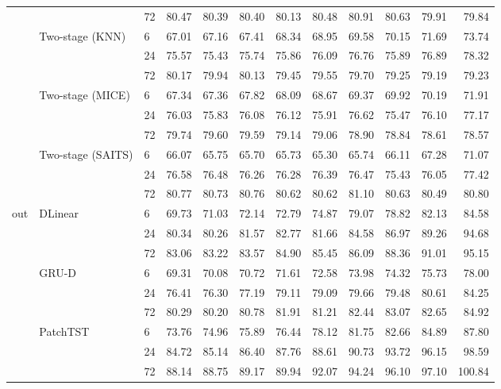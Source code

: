 \begin{table}
\begin{tabular}{lllrrrrrrrrr}
 &  & 72 & 80.47 & 80.39 & 80.40 & 80.13 & 80.48 & 80.91 & 80.63 & 79.91 & 79.84 \\
\cline{2-12}
 & \multirow[t]{3}{*}{Two-stage (KNN)} & 6 & 67.01 & 67.16 & 67.41 & 68.34 & 68.95 & 69.58 & 70.15 & 71.69 & 73.74 \\
 &  & 24 & 75.57 & 75.43 & 75.74 & 75.86 & 76.09 & 76.76 & 75.89 & 76.89 & 78.32 \\
 &  & 72 & 80.17 & 79.94 & 80.13 & 79.45 & 79.55 & 79.70 & 79.25 & 79.19 & 79.23 \\
\cline{2-12}
 & \multirow[t]{3}{*}{Two-stage (MICE)} & 6 & 67.34 & 67.36 & 67.82 & 68.09 & 68.67 & 69.37 & 69.92 & 70.19 & 71.91 \\
 &  & 24 & 76.03 & 75.83 & 76.08 & 76.12 & 75.91 & 76.62 & 75.47 & 76.10 & 77.17 \\
 &  & 72 & 79.74 & 79.60 & 79.59 & 79.14 & 79.06 & 78.90 & 78.84 & 78.61 & 78.57 \\
\cline{2-12}
 & \multirow[t]{3}{*}{Two-stage (SAITS)} & 6 & 66.07 & 65.75 & 65.70 & 65.73 & 65.30 & 65.74 & 66.11 & 67.28 & 71.07 \\
 &  & 24 & 76.58 & 76.48 & 76.26 & 76.28 & 76.39 & 76.47 & 75.43 & 76.05 & 77.42 \\
 &  & 72 & 80.77 & 80.73 & 80.76 & 80.62 & 80.62 & 81.10 & 80.63 & 80.49 & 80.80 \\
\cline{1-12} \cline{2-12}
\multirow[t]{24}{*}{out} & \multirow[t]{3}{*}{DLinear} & 6 & 69.73 & 71.03 & 72.14 & 72.79 & 74.87 & 79.07 & 78.82 & 82.13 & 84.58 \\
 &  & 24 & 80.34 & 80.26 & 81.57 & 82.77 & 81.66 & 84.58 & 86.97 & 89.26 & 94.68 \\
 &  & 72 & 83.06 & 83.22 & 83.57 & 84.90 & 85.45 & 86.09 & 88.36 & 91.01 & 95.15 \\
\cline{2-12}
 & \multirow[t]{3}{*}{GRU-D} & 6 & 69.31 & 70.08 & 70.72 & 71.61 & 72.58 & 73.98 & 74.32 & 75.73 & 78.00 \\
 &  & 24 & 76.41 & 76.30 & 77.19 & 79.11 & 79.09 & 79.66 & 79.48 & 80.61 & 84.25 \\
 &  & 72 & 80.29 & 80.20 & 80.78 & 81.91 & 81.21 & 82.44 & 83.07 & 82.65 & 84.92 \\
\cline{2-12}
 & \multirow[t]{3}{*}{PatchTST} & 6 & 73.76 & 74.96 & 75.89 & 76.44 & 78.12 & 81.75 & 82.66 & 84.89 & 87.80 \\
 &  & 24 & 84.72 & 85.14 & 86.40 & 87.76 & 88.61 & 90.73 & 93.72 & 96.15 & 98.59 \\
 &  & 72 & 88.14 & 88.75 & 89.17 & 89.94 & 92.07 & 94.24 & 96.10 & 97.10 & 100.84 \\

\end{tabular}
\end{table}
